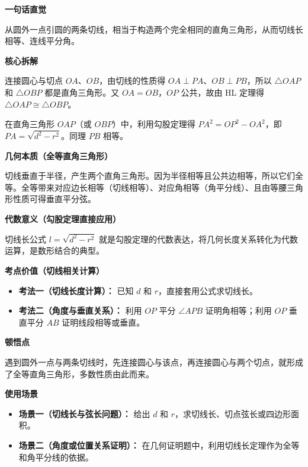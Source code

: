 \begin{explanationbox}
	\textbf{\textcolor{CExplanation}{一句话直觉}}

	从圆外一点引圆的两条切线，相当于构造两个完全相同的直角三角形，从而切线长相等、连线平分角。

	\medskip
	\textbf{\textcolor{CExplanation}{核心拆解}}
	\begin{description}[style=nextline, leftmargin=2.8em, labelsep=0.5em, itemsep=0.45em]
		\item[\textbf{要点一（全等三角形构造）：}] 连接圆心与切点 $OA$、$OB$，由切线的性质得 $OA\perp PA$、$OB\perp PB$，所以 $\triangle OAP$ 和 $\triangle OBP$ 都是直角三角形。又 $OA=OB$，$OP$ 公共，故由 HL 定理得 $\triangle OAP\cong\triangle OBP$。
		\item[\textbf{要点二（勾股公式推导）：}] 在直角三角形 $OAP$（或 $OBP$）中，利用勾股定理得 $PA^{2}=OP^{2}-OA^{2}$，即 $PA=\sqrt{d^{2}-r^{2}}$。同理 $PB$ 相等。
	\end{description}

	\medskip
	\textbf{\textcolor{CExplanation}{几何本质（全等直角三角形）}}

	切线垂直于半径，产生两个直角三角形。因为半径相等且公共边相等，所以它们全等。全等带来对应边长相等（切线相等）、对应角相等（角平分线）、且由等腰三角形性质可得垂直平分弦。

	\medskip
	\textbf{\textcolor{CExplanation}{代数意义（勾股定理直接应用）}}

	切线长公式 $l=\sqrt{d^{2}-r^{2}}$ 就是勾股定理的代数表达，将几何长度关系转化为代数运算，是数形结合的典型。

	\medskip
	\textbf{\textcolor{CExplanation}{考点价值（切线相关计算）}}
	\begin{itemize}[leftmargin=*, itemsep=0.5em, topsep=0.4em]
		\item \textbf{考法一（切线长度计算）：} 已知 $d$ 和 $r$，直接套用公式求切线长。
		\item \textbf{考法二（角度与垂直关系）：} 利用 $OP$ 平分 $\angle APB$ 证明角相等；利用 $OP$ 垂直平分 $AB$ 证明线段相等或垂直。
	\end{itemize}

	\medskip
	\textbf{\textcolor{CExplanation}{顿悟点}}

	遇到圆外一点与两条切线时，先连接圆心与该点，再连接圆心与两个切点，就形成了全等直角三角形，多数性质由此而来。

	\medskip
	\textbf{\textcolor{CExplanation}{使用场景}}
	\begin{itemize}[leftmargin=*, itemsep=0.5em, topsep=0.4em]
		\item \textbf{场景一（切线长与弦长问题）：} 给出 $d$ 和 $r$，求切线长、切点弦长或四边形面积。
		\item \textbf{场景二（角度或位置关系证明）：} 在几何证明题中，利用切线长定理作为全等和角平分线的依据。
	\end{itemize}
\end{explanationbox}
